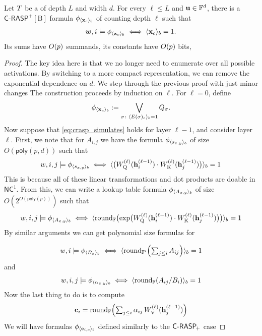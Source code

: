 \begin{theorem} \label{thm:transformer_to_crasp}
Let ${T}$ be a \frtfr{} of depth $L$ and width $d$. For every $\ell\leq L$ and $\mathbf{u}\in\mathbb{F}^d$, there is a
$\mathsf{C\text{-}RASP}^+[\mathrm{B}]$  formula $\phi_{\langle\mathbf{x}_c\rangle_{{b}}}$ of counting depth $\ell$ such that
\begin{equation}
{{\boldsymbol{w}}},i\models\phi_{\langle\mathbf{x}_c\rangle_{{b}}}\iff \langle\mathbf{x}_c\rangle_{{b}}=1.
\label{eq:crasp_simulates}
\end{equation}
Its sums have $O({p})$ summands, its constants have $O({p})$ bits,
\end{theorem}
\begin{proof}
    The key idea here is that we no longer need to enumerate over all possible activations. 
    By switching to a more compact representation, we can remove the exponential dependence on $d$.
    We step through the previous proof with just minor changes
    The construction proceeds by induction on $\ell$. For $\ell=0$, define
\[
\phi_{\langle\mathbf{x}_c\rangle_{{b}}} := \bigvee_{\sigma\colon \langle E(\sigma)_c\rangle_{{b}}=1}Q_\sigma.
\]
Now suppose that \cref{eq:crasp_simulates} holds for layer $\ell-1$, and consider layer $\ell$.
First, we note that for $A_{i,j}$ we have the formula $\phi_{\langle s_{x,y}\rangle_{{b}}}$ of size $O(\mathsf{poly}(p,d))$ such that 
\[w,i,j\models\phi_{\langle s_{x,y}\rangle_{{b}}} \iff \langle\bigl(W_{\textnormal{Q}}^{(\ell)}(\mathbf{h}^{(\ell-1)}_i)\cdot W_{\textnormal{K}}^{(\ell)}(\mathbf{h}^{(\ell-1)}_j)\bigr)\rangle_{{b}}=1\]
This is because all of these linear transformations and dot products are doable in $\mathsf{NC}^1$. 
From this, we can write a lookup table formula $\phi_{\langle A_{x,y}\rangle_{{b}}}$ of size $O(2^{O(\mathsf{poly}(p))})$ such that 
\[w,i,j\models\phi_{\langle A_{x,y}\rangle_{{b}}} \iff \langle\textnormal{round}_{\mathbb{F}}\bigl(\exp\bigl(W_{\textnormal{Q}}^{(\ell)}(\mathbf{h}^{(\ell-1)}_i)\cdot W_{\textnormal{K}}^{(\ell)}(\mathbf{h}^{(\ell-1)}_j)\bigr)\bigr)\rangle_{{b}}=1\]
By similar arguments we can get polynomial size formulas for 

\[w,i\models\phi_{\langle B_x\rangle_{{b}}} \iff \langle\textnormal{round}_{\mathbb{F}'}\Bigl(\textstyle\sum_{j\leq i}A_{ij}\Bigr)\rangle_{{b}}=1\]
and 
\[w,i,j\models\phi_{\langle\alpha_{x,y}\rangle_{{b}}} \iff \langle\textnormal{round}_{\mathbb{F}}(A_{ij}/B_i)\rangle_{{b}}=1\]
Now the last thing to do is to compute
\[\mathbf{c}_i= \textnormal{round}_{\mathbb{F}}\Bigl(\textstyle\sum_{j\leq i}\alpha_{ij}\,W_{\textnormal{V}}^{(\ell)}(\mathbf{h}^{(\ell-1)}_j)\Bigr)\]
We will have formulas $\phi_{\langle\mathbf{c}_{i,c}\rangle_{{b}}}$ defined similarly to the ${\mathsf{C\textsf{-}RASP}_{\!+}}$ case


\end{proof}
